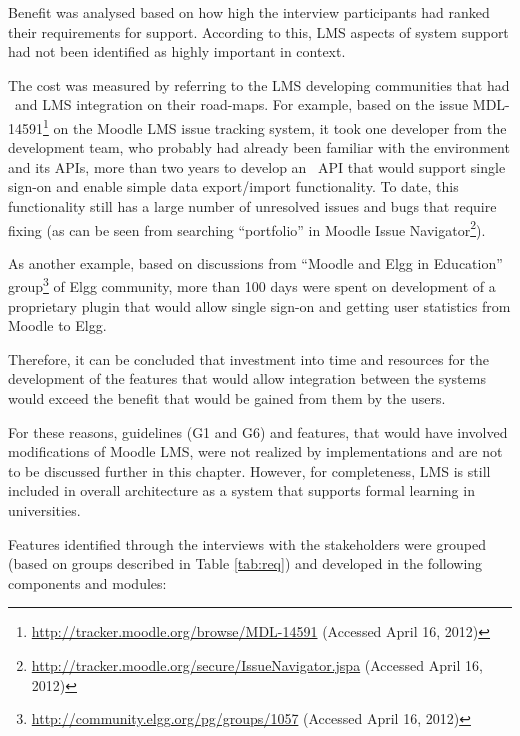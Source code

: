 Benefit was analysed based on how high the interview participants had ranked
their requirements for \LLLs support. According to this, LMS aspects of system
support had not been identified as highly important in \LLLs context. 

The cost was measured by referring to the LMS developing communities that had
\ep~and LMS integration on their road-maps. For example, based on the issue
MDL-14591\footnote{\url{http://tracker.moodle.org/browse/MDL-14591} (Accessed
April 16, 2012)} on the Moodle LMS issue tracking system, it took one developer
from the development team, who probably had already been familiar with the
environment and its APIs, more than two years to develop an \ep~API that would
support single sign-on and enable simple data export/import functionality. To
date, this functionality still has a large number of unresolved issues and bugs
that require fixing (as can be seen from searching ``portfolio'' in Moodle Issue
Navigator\footnote{\url{http://tracker.moodle.org/secure/IssueNavigator.jspa}
(Accessed April 16, 2012)}).

As another example, based on discussions from ``Moodle and Elgg in Education''
group\footnote{\url{http://community.elgg.org/pg/groups/1057}
(Accessed April 16, 2012)} of Elgg community, more than 100 days were spent on development of a proprietary
plugin that would allow single sign-on and getting user statistics from Moodle
to Elgg.

Therefore, it can be concluded that investment into time and resources for the
development of the features that would allow integration between the systems
would exceed the benefit that would be gained from them by the users.

For these reasons, guidelines (G1 and G6) and features, that would have involved
modifications of Moodle LMS, were not realized by implementations and are not to
be discussed further in this chapter. However, for completeness, LMS is still
included in overall architecture as a system that supports formal learning in
universities.
 
Features identified through the interviews with the stakeholders were grouped
(based on groups described in Table \ref{tab:req}) and developed in the
following components and modules:

